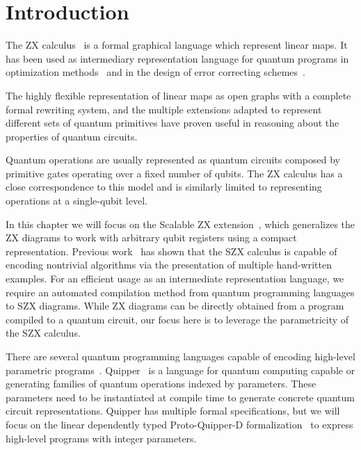 \section{Introduction}%
\label{sec:introduction}

The ZX calculus~\cite{vdw_working_cs_zx} is a formal graphical language which represent linear maps. It has been used as intermediary representation language for quantum programs in optimization methods~\cite{DKPW2019qcircSimpl,borgna_hybrid_2021,Backens_2021} and in the design of error correcting schemes~\cite{de_beaudrap_zx_2020}.

The highly flexible representation of linear maps as open graphs with a complete formal rewriting system, and the multiple extensions adapted to represent different sets of quantum primitives have proven useful in reasoning about the properties of quantum circuits.

Quantum operations are usually represented as quantum circuits composed by primitive gates operating over a fixed number of qubits. The ZX calculus has a close correspondence to this model and is similarly limited to representing operations at a single-qubit level.

In this chapter we will focus on the Scalable ZX extension~\cite{carette_szx-calculus_2019}, which generalizes the ZX diagrams to work with arbitrary qubit registers using a compact representation. Previous work~\cite{carette_quantum_2021} has shown that the SZX calculus is capable of encoding nontrivial algorithms via the presentation of multiple hand-written examples. For an efficient usage as an intermediate representation language, we require an automated compilation method from quantum programming languages to SZX diagrams. While ZX diagrams can be directly obtained from a program compiled to a quantum circuit, our focus here is to leverage the parametricity of the SZX calculus.

There are several quantum programming languages capable of encoding high-level parametric programs~\cite{qiskit,cirq,Steiger2018projectQ}. Quipper~\cite{Green2013quipper} is a language for quantum computing capable or generating families of quantum operations indexed by parameters. These parameters need to be instantiated at compile time to generate concrete quantum circuit representations. Quipper has multiple formal specifications, but we will focus on the linear dependently typed Proto-Quipper-D formalization~\cite{fu_linear_2021,fu_tutorial_2020} to express high-level programs with integer parameters.

